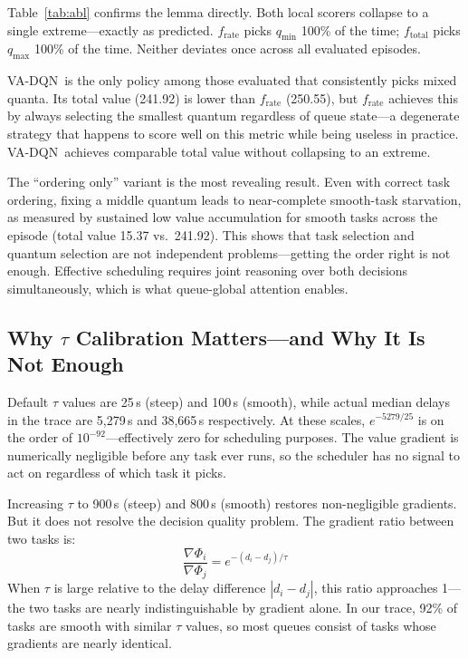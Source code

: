 \documentclass[10pt,twocolumn]{article}
\theoremstyle{remark}
\newcommand{\vadqn}{VA-DQN}
\begin{document}
Table~\ref{tab:abl} confirms the lemma directly. Both local scorers
collapse to a single extreme---exactly as predicted. $f_{\mathrm{rate}}$
picks $q_{\min}$ 100\% of the time; $f_{\mathrm{total}}$ picks
$q_{\max}$ 100\% of the time. Neither deviates once across all
evaluated episodes.

\vadqn\ is the only policy among those evaluated that consistently
picks mixed quanta. Its total value (241.92) is lower than
$f_{\mathrm{rate}}$ (250.55), but $f_{\mathrm{rate}}$ achieves this
by always selecting the smallest quantum regardless of queue
state---a degenerate strategy that happens to score well on this
metric while being useless in practice. \vadqn\ achieves comparable
total value without collapsing to an extreme.

The ``ordering only'' variant is the most revealing result. Even
with correct task ordering, fixing a middle quantum leads to
near-complete smooth-task starvation, as measured by sustained low
value accumulation for smooth tasks across the episode (total value
15.37 vs.\ 241.92). This shows that task selection and quantum
selection are not independent problems---getting the order right is
not enough. Effective scheduling requires joint reasoning over both
decisions simultaneously, which is what queue-global attention
enables.

\subsection{Why $\tau$ Calibration Matters---and Why It Is Not Enough}

Default $\tau$ values are 25\,s (steep) and 100\,s (smooth), while
actual median delays in the trace are 5,279\,s and 38,665\,s
respectively. At these scales, $e^{-5279/25}$ is on the order of
$10^{-92}$---effectively zero for scheduling purposes. The value
gradient is numerically negligible before any task ever runs, so the
scheduler has no signal to act on regardless of which task it picks.

Increasing $\tau$ to 900\,s (steep) and 800\,s (smooth) restores
non-negligible gradients. But it does not resolve the decision
quality problem. The gradient ratio between two tasks is:
\begin{equation}
  \frac{\nabla\Phi_i}{\nabla\Phi_j} =
  e^{-(d_i-d_j)/\tau}
\end{equation}
When $\tau$ is large relative to the delay difference $|d_i - d_j|$,
this ratio approaches 1---the two tasks are nearly indistinguishable
by gradient alone. In our trace, 92\% of tasks are smooth with
similar $\tau$ values, so most queues consist of tasks whose
gradients are nearly identical.
\end{document}
